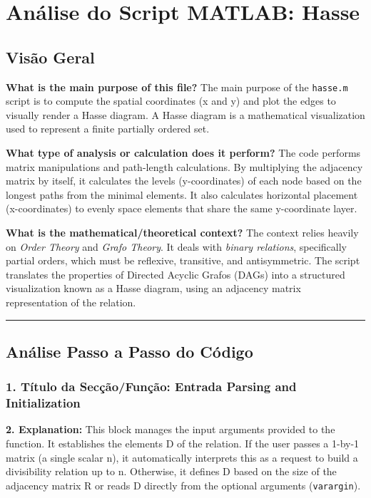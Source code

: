 \chapter{Análise do Script MATLAB: Hasse}

\section{Visão Geral}

\textbf{What is the main purpose of this file?}
The main purpose of the \texttt{hasse.m} script is to compute the spatial coordinates (x and y) and plot the edges to visually render a Hasse diagram. A Hasse diagram is a mathematical visualization used to represent a finite partially ordered set.

\textbf{What type of analysis or calculation does it perform?}
The code performs matrix manipulations and path-length calculations. By multiplying the adjacency matrix by itself, it calculates the levels (y-coordinates) of each node based on the longest paths from the minimal elements. It also calculates horizontal placement (x-coordinates) to evenly space elements that share the same y-coordinate layer.

\textbf{What is the mathematical/theoretical context?}
The context relies heavily on \textit{Order Theory} and \textit{Grafo Theory}. It deals with \textit{binary relations}, specifically partial orders, which must be reflexive, transitive, and antisymmetric. The script translates the properties of Directed Acyclic Grafos (DAGs) into a structured visualization known as a Hasse diagram, using an adjacency matrix representation of the relation.

\vspace{0.5cm}
\hrule
\vspace{0.5cm}

\section{Análise Passo a Passo do Código}

\subsection*{1. Título da Secção/Função: Entrada Parsing and Initialization}
\textbf{2. Explanation:} This block manages the input arguments provided to the function. It establishes the elements D of the relation. If the user passes a 1-by-1 matrix (a single scalar n), it automatically interprets this as a request to build a divisibility relation up to n. Otherwise, it defines D based on the size of the adjacency matrix R or reads D directly from the optional arguments (\texttt{varargin}).

